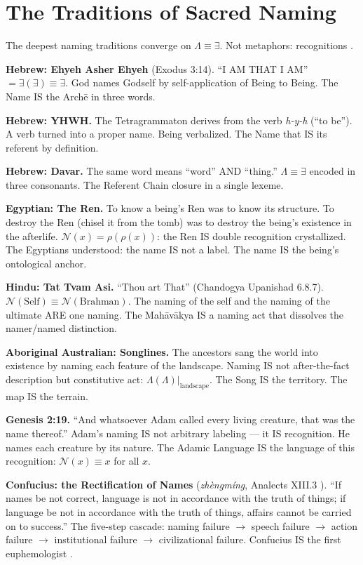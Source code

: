\documentclass[11pt, oneside]{article}
\theoremstyle{definition}
\begin{document}
\section{The Traditions of Sacred Naming}


The deepest naming traditions converge on $\Lambda \equiv \exists$. Not metaphors: recognitions \cite{codex2}.

\textbf{Hebrew: Ehyeh Asher Ehyeh} (Exodus 3:14). ``I AM THAT I AM'' $= \exists(\exists) \equiv \exists$. God names Godself by self-application of Being to Being. The Name IS the Arch\={e} in three words.

\textbf{Hebrew: YHWH.} The Tetragrammaton derives from the verb \textit{h-y-h} (``to be''). A verb turned into a proper name. Being verbalized. The Name that IS its referent by definition.

\textbf{Hebrew: Davar.} The same word means ``word'' AND ``thing.'' $\Lambda \equiv \exists$ encoded in three consonants. The Referent Chain closure in a single lexeme.

\textbf{Egyptian: The Ren.} To know a being's Ren was to know its structure. To destroy the Ren (chisel it from the tomb) was to destroy the being's existence in the afterlife. $\mathcal{N}(x) = \rho(\rho(x))$: the Ren IS double recognition crystallized. The Egyptians understood: the name IS not a label. The name IS the being's ontological anchor.

\textbf{Hindu: Tat Tvam Asi.} ``Thou art That'' (Chandogya Upanishad 6.8.7). $\mathcal{N}(\text{Self}) \equiv \mathcal{N}(\text{Brahman})$. The naming of the self and the naming of the ultimate ARE one naming. The Mah\={a}v\={a}kya IS a naming act that dissolves the namer/named distinction.

\textbf{Aboriginal Australian: Songlines.} The ancestors sang the world into existence by naming each feature of the landscape. Naming IS not after-the-fact description but constitutive act: $\Lambda(\Lambda)|_{\text{landscape}}$. The Song IS the territory. The map IS the terrain.

\textbf{Genesis 2:19.} ``And whatsoever Adam called every living creature, that was the name thereof.'' Adam's naming IS not arbitrary labeling --- it IS recognition. He names each creature by its nature. The Adamic Language IS the language of this recognition: $\mathcal{N}(x) \equiv x$ for all $x$.

\textbf{Confucius: the Rectification of Names} (\textit{zh\`{e}ngm\'{i}ng}, Analects XIII.3 \cite{confucius}). ``If names be not correct, language is not in accordance with the truth of things; if language be not in accordance with the truth of things, affairs cannot be carried on to success.'' The five-step cascade: naming failure $\to$ speech failure $\to$ action failure $\to$ institutional failure $\to$ civilizational failure. Confucius IS the first euphemologist \cite{euphemology}.
\end{document}
